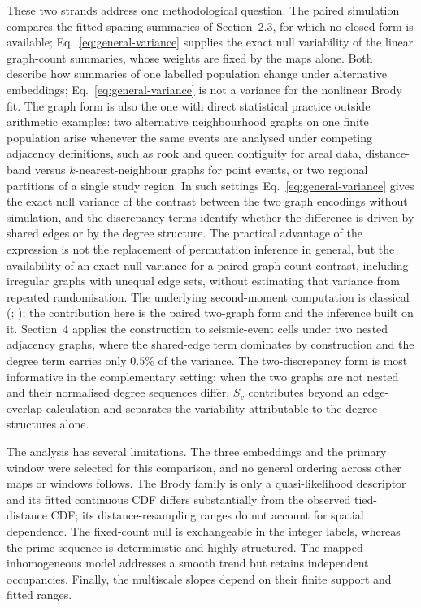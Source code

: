 \documentclass[final,1p,times,authoryear]{elsarticle}
\theoremstyle{definition}
\begin{document}
These two strands address one methodological question. The paired simulation
compares the fitted spacing summaries of Section~2.3, for which no closed form
is available; Eq.~\eqref{eq:general-variance} supplies the exact null
variability of the linear graph-count summaries, whose weights are fixed by
the maps alone. Both describe how summaries of one labelled population change
under alternative embeddings; Eq.~\eqref{eq:general-variance} is not a
variance for the nonlinear Brody fit. The graph form is also the one with
direct statistical practice outside arithmetic examples: two alternative
neighbourhood graphs on one finite population arise whenever the same events
are analysed under competing adjacency definitions, such as rook and queen
contiguity for areal data, distance-band versus $k$-nearest-neighbour graphs
for point events, or two regional partitions of a single study region. In
such settings Eq.~\eqref{eq:general-variance} gives the exact null variance of
the contrast between the two graph encodings without simulation, and the
discrepancy terms identify whether the difference is driven by shared edges
or by the degree structure. The practical advantage of the expression is not
the replacement of permutation inference in general, but the availability of
an exact null variance for a paired graph-count contrast, including irregular
graphs with unequal edge sets, without estimating that variance from repeated
randomisation. The underlying second-moment computation is classical
(\citet{CLIFF-ORD-1981}; \citet{DANIELS-1944}); the contribution here is the
paired two-graph form and the inference built on it. Section~4 applies the construction to
seismic-event cells under two nested adjacency graphs, where the
shared-edge term dominates by construction and the degree term carries only
$0.5\%$ of the variance. The two-discrepancy form is most informative in the
complementary setting: when the two graphs are not nested and their
normalised degree sequences differ, $S_v$ contributes beyond an edge-overlap
calculation and separates the variability attributable to the degree
structures alone.

The analysis has several limitations. The three embeddings and the primary
window were selected for this comparison, and no general ordering across
other maps or windows follows. The Brody family is only a quasi-likelihood
descriptor and its fitted continuous CDF differs substantially from the
observed tied-distance CDF; its distance-resampling ranges do not account for
spatial dependence. The
fixed-count null is exchangeable in the integer labels, whereas the prime
sequence is deterministic and highly structured. The mapped inhomogeneous
model addresses a smooth trend but retains independent occupancies. Finally,
the multiscale slopes depend on their finite support and fitted ranges.
\end{document}
